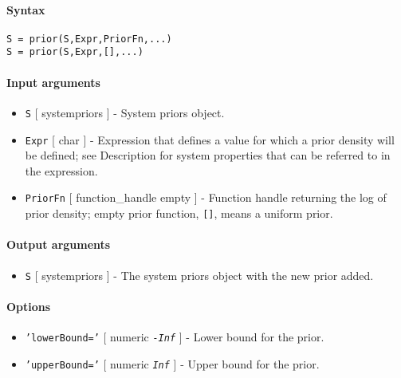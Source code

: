 


	\paragraph{Syntax}

\begin{verbatim}
S = prior(S,Expr,PriorFn,...)
S = prior(S,Expr,[],...)
\end{verbatim}

\paragraph{Input arguments}

\begin{itemize}
\item
  \texttt{S} {[} systempriors {]} - System priors object.
\item
  \texttt{Expr} {[} char {]} - Expression that defines a value for which
  a prior density will be defined; see Description for system properties
  that can be referred to in the expression.
\item
  \texttt{PriorFn} {[} function\_handle \textbar{} empty {]} - Function
  handle returning the log of prior density; empty prior function,
  \texttt{{[}{]}}, means a uniform prior.
\end{itemize}

\paragraph{Output arguments}

\begin{itemize}
\itemsep1pt\parskip0pt
\item
  \texttt{S} {[} systempriors {]} - The system priors object with the
  new prior added.
\end{itemize}

\paragraph{Options}

\begin{itemize}
\item
  \texttt{'lowerBound='} {[} numeric \textbar{} \emph{\texttt{-Inf}} {]}
  - Lower bound for the prior.
\item
  \texttt{'upperBound='} {[} numeric \textbar{} \emph{\texttt{Inf}} {]}
  - Upper bound for the prior.
\end{itemize}


